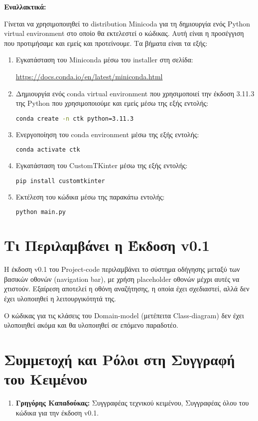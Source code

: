 \documentclass[12pt,a4paper]{article}
\begin{document}
\textbf{Εναλλακτικά:}

Γίνεται να χρησιμοποιηθεί το distribution Minicoda για τη δημιουργία ενός Python virtual environment στο οποίο θα εκτελεστεί ο κώδικας. Αυτή είναι η προσέγγιση που προτιμήσαμε και εμείς και προτείνουμε. Τα βήματα είναι τα εξής:

\begin{enumerate}
    \item Εγκατάσταση του Miniconda μέσω του installer στη σελίδα:

        \textcolor{blue}{\href{https://docs.conda.io/en/latest/miniconda.html}{https://docs.conda.io/en/latest/miniconda.html}}
    \item Δημιουργία ενός conda virtual environment που χρησιμοποιεί την έκδοση 3.11.3 της Python που χρησιμοποιούμε και εμείς μέσω της εξής εντολής:

\begin{lstlisting}[language=Bash]
conda create -n ctk python=3.11.3\end{lstlisting}

    \item Ενεργοποίηση του conda environment μέσω της εξής εντολής:

\begin{lstlisting}[language=Bash]
conda activate ctk\end{lstlisting}

    \item Εγκατάσταση του CustomTKinter μέσω της εξής εντολής:

\begin{lstlisting}[language=Bash]
pip install customtkinter\end{lstlisting}

    \item Εκτέλεση του κώδικα μέσω της παρακάτω εντολής:
\begin{lstlisting}[language=Bash]
python main.py\end{lstlisting}

\end{enumerate}

\section{Τι Περιλαμβάνει η Έκδοση v0.1}

Η έκδοση v0.1 του Project-code περιλαμβάνει το σύστημα οδήγησης μεταξύ των βασικών οθονών (navigation bar), με χρήση placeholder οθονών μέχρι αυτές να χτιστούν. Εξαίρεση αποτελεί η οθόνη αναζήτησης, η οποία έχει σχεδιαστεί, αλλά δεν έχει υλοποιηθεί η λειτουργικότητά της.

Ο κώδικας για τις κλάσεις του Domain-model (μετέπειτα Class-diagram) δεν έχει υλοποιηθεί ακόμα και θα υλοποιηθεί σε επόμενο παραδοτέο.

\section{Συμμετοχή και Ρόλοι στη Συγγραφή του Κειμένου}
\begin{enumerate}
	\item \textbf{Γρηγόρης Καπαδούκας:} Συγγραφέας τεχνικού κειμένου, Συγγραφέας όλου του κώδικα για την έκδοση v0.1.
\end{enumerate}
\end{document}
